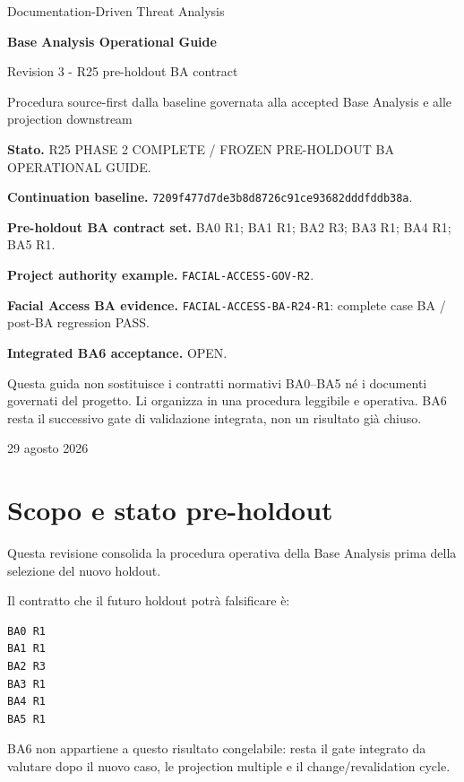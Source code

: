 \documentclass[11pt,a4paper]{article}
\newcommand{\code}[1]{\nolinkurl{#1}}
\begin{document}
\begin{titlepage}
\centering
\vspace*{1.5cm}
{\Large Documentation-Driven Threat Analysis\par}
\vspace{0.8cm}
{\Huge\bfseries Base Analysis Operational Guide\par}
\vspace{0.25cm}
{\LARGE Revision 3 - R25 pre-holdout BA contract\par}
\vspace{0.9cm}
{\large Procedura source-first dalla baseline governata alla accepted Base Analysis e alle projection downstream\par}
\vfill
\begin{minipage}{0.88\textwidth}
\small
\textbf{Stato.} R25 PHASE 2 COMPLETE / FROZEN PRE-HOLDOUT BA OPERATIONAL GUIDE.

\medskip
\textbf{Continuation baseline.} \code{7209f477d7de3b8d8726c91ce93682dddfddb38a}.

\medskip
\textbf{Pre-holdout BA contract set.} BA0 R1; BA1 R1; BA2 R3; BA3 R1; BA4 R1; BA5 R1.

\medskip
\textbf{Project authority example.} \code{FACIAL-ACCESS-GOV-R2}.

\medskip
\textbf{Facial Access BA evidence.} \code{FACIAL-ACCESS-BA-R24-R1}: complete case BA / post-BA regression PASS.

\medskip
\textbf{Integrated BA6 acceptance.} OPEN.

\medskip
Questa guida non sostituisce i contratti normativi BA0--BA5 né i documenti governati del progetto. Li organizza in una procedura leggibile e operativa. BA6 resta il successivo gate di validazione integrata, non un risultato già chiuso.
\end{minipage}
\vfill
{\large 29 agosto 2026\par}
\end{titlepage}

\tableofcontents
\newpage
{}

\section{Scopo e stato pre-holdout}

Questa revisione consolida la procedura operativa della Base Analysis prima della selezione del nuovo holdout.

\begin{closedbox}
Il contratto che il futuro holdout potrà falsificare è:
\begin{lstlisting}
BA0 R1
BA1 R1
BA2 R3
BA3 R1
BA4 R1
BA5 R1
\end{lstlisting}
BA6 non appartiene a questo risultato congelabile: resta il gate integrato da valutare dopo il nuovo caso, le projection multiple e il change/revalidation cycle.
\end{closedbox}
\end{document}

